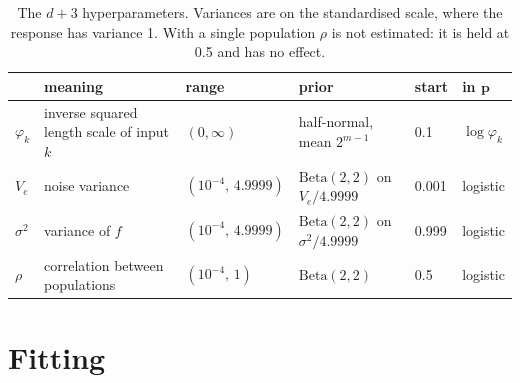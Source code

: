 \documentclass[11pt,a4paper]{article}
\newcommand{\ve}{V_e}
\numberwithin{equation}{section}
\begin{document}
\begin{table}[htbp]
\centering\small
\begin{tabular}{@{}llllll@{}}
\toprule
 & meaning & range & prior & start & in $\bm{p}$ \\
\midrule
$\varphi_k$ & inverse squared length scale of input $k$ & $(0,\infty)$ & half-normal, mean $2^{m-1}$ & 0.1 & $\log\varphi_k$ \\
$\ve$ & noise variance & $(10^{-4},\,4.9999)$ & $\mathrm{Beta}(2,2)$ on $\ve/4.9999$ & 0.001 & logistic \\
$\sigma^2$ & variance of $f$ & $(10^{-4},\,4.9999)$ & $\mathrm{Beta}(2,2)$ on $\sigma^2/4.9999$ & 0.999 & logistic \\
$\rho$ & correlation between populations & $(10^{-4},\,1)$ & $\mathrm{Beta}(2,2)$ & 0.5 & logistic \\
\bottomrule
\end{tabular}
\caption{The $d+3$ hyperparameters. Variances are on the standardised scale, where the response
has variance 1. With a single population $\rho$ is not estimated: it is held at 0.5 and has no
effect.}
\label{tab:pars}
\end{table}

\section{Fitting}
\label{sec:fit}
\end{document}
